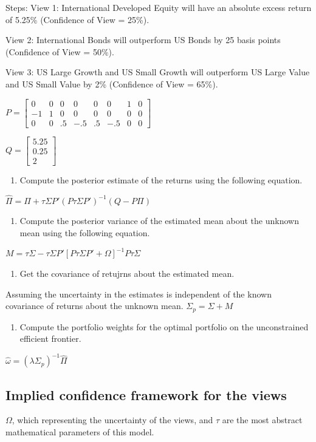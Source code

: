 \documentclass[presentation]{beamer}
\begin{document}
\begin{frame}[label={sec:orgheadline26}]{Steps:}
View 1: International Developed Equity will have an absolute excess return of 5.25\% (Confidence of View = 25\%).

View 2: International Bonds will outperform US Bonds by 25 basis points (Confidence of View = 50\%).

View 3: US Large Growth and US Small Growth will outperform US Large Value and US Small Value by 2\% (Confidence of View = 65\%).

\(P=\begin{bmatrix}
0 &0  &0  &0  &0  &0  &1  &0 \\
-1 &1  &0  &0  &0  &0  &0  &0 \\
0 &0  &.5  &-.5  &.5  &-.5  &0  &0
\end{bmatrix}\)

\(Q=\begin{bmatrix}
 5.25 \\
 0.25 \\
 2
\end{bmatrix}\)

\begin{enumerate}
\item Compute the posterior estimate of the returns using the following equation.
\end{enumerate}
\(\hat\Pi = \Pi + \tau\Sigma P'(P\tau\Sigma P')^{-1}(Q-P\Pi)\)
\begin{enumerate}
\item Compute the posterior variance of the estimated mean about the unknown mean using the following equation.
\end{enumerate}
\(M=\tau \Sigma - \tau \Sigma P'[P\tau\Sigma P'+\Omega]^{-1}P\tau \Sigma\)
\begin{enumerate}
\item Get the covariance of retujrns about the estimated mean.
\end{enumerate}
Assuming the uncertainty in the estimates is independent of the known covariance of returns about the unknown mean.
\(\Sigma_p = \Sigma + M\)
\begin{enumerate}
\item Compute the portfolio weights for the optimal portfolio on the unconstrained efficient frontier.
\end{enumerate}
\(\hat {\omega}=(\lambda\Sigma_p)^{-1}\hat {\Pi}\)
\end{frame}

\subsection{Implied confidence framework for the views}
\label{sec:orgheadline30}
\(\Omega\), which representing the uncertainty of the views, and \(\tau\) are the most abstract mathematical parameters of this model.
\end{document}
